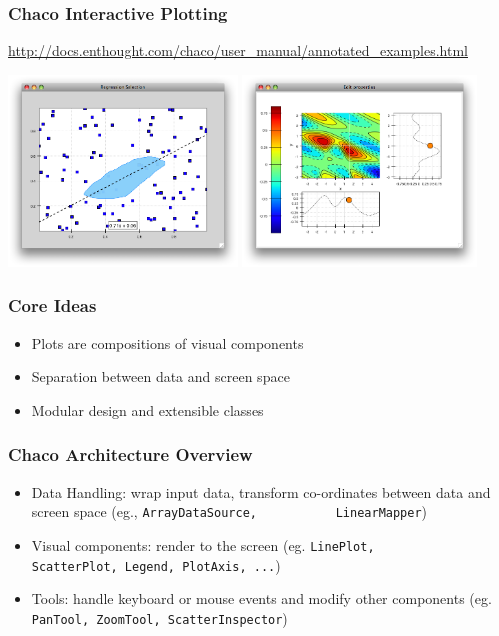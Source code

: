 \documentclass[14pt,compress]{beamer}
\newcommand{\typ}[1]{\lstinline{#1}}
\begin{document}
\begin{frame}
  \frametitle{Chaco Interactive Plotting}
\scriptsize
\url{http://docs.enthought.com/chaco/user_manual/annotated_examples.html}
\begin{center}
    \includegraphics[height=2in, interpolate=true]{images/chaco_regr}
    \includegraphics[height=2in, interpolate=true]{images/chaco_cmapi}
\end{center}
\end{frame}

\begin{frame}
  \frametitle{Core Ideas}
  \begin{itemize}
      \item Plots are compositions of visual components

      \item Separation between data and screen space

      \item Modular design and extensible classes

  \end{itemize}
\end{frame}



\begin{frame}
  \frametitle{Chaco Architecture Overview}
  \begin{itemize}

      \item Data Handling: wrap input data, transform co-ordinates
          between data and screen space (eg., \typ{ArrayDataSource,
          LinearMapper})

      \item Visual components: render to the screen (eg. \typ{LinePlot,
          ScatterPlot, Legend, PlotAxis, ...})

      \item Tools: handle keyboard or mouse events and modify other
          components (eg. \typ{PanTool, ZoomTool, ScatterInspector})

  \end{itemize}
\end{frame}
\end{document}
